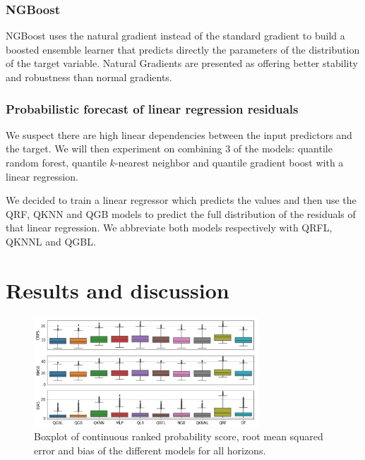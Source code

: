 \documentclass[a4paper,3p,sort&compress]{elsarticle}
\begin{document}
\subsubsection{NGBoost}

NGBoost \cite{duan_ngboost_2019} uses the natural gradient 
instead of the standard gradient to 
build a boosted ensemble 
learner that predicts directly 
the parameters of the distribution of the target variable.
Natural Gradients are presented as offering better stability and robustness 
than normal gradients.


\subsubsection{Probabilistic forecast of linear regression residuals}

We suspect there are high linear dependencies between the
input predictors and the target. We will then experiment 
on combining 3 of the models: quantile random forest, quantile
$k$-nearest neighbor and quantile gradient boost with a linear regression.

We decided to train a linear regressor which predicts the
\no values and then use the QRF, QKNN and QGB models 
to predict the full distribution of the residuals
of that linear regression. We abbreviate both models respectively with
QRFL, QKNNL and QGBL.

\section{Results and discussion}
\label{sec:results}

\begin{figure}[tbp]
  \centering
  \includegraphics[width=0.75\textwidth]{error_graph}
  \caption{\label{figure:errorGraph}
    Boxplot of continuous ranked probability score, root mean squared
    error and bias of the different models for all horizons.
  }
\end{figure}
\end{document}
